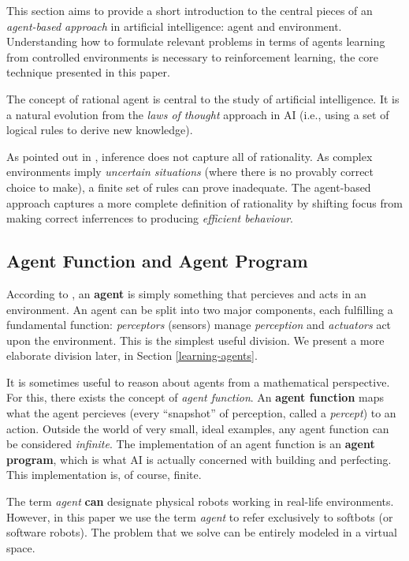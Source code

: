 This section aims to provide a short introduction to the central pieces of an \emph{agent-based approach} in artificial intelligence: agent and environment.
Understanding how to formulate relevant problems in terms of agents learning from controlled environments is necessary to reinforcement learning, the core technique presented in this paper.

The concept of rational agent is central to the study of artificial intelligence. 
It is a natural evolution from the \emph{laws of thought} approach in AI (i.e., using a set of logical rules to derive new knowledge).

As pointed out in \cite{aima}, inference does not capture all of rationality.
As complex environments imply \textit{uncertain situations} (where there is no provably correct choice to make), a finite set of rules can prove inadequate.
The agent-based approach captures a more complete definition of rationality by shifting focus from making correct inferrences to producing \emph{efficient behaviour}.

\subsection{Agent Function and Agent Program}
According to \cite{aima}, an \textbf{agent} is simply something that percieves and acts in an environment.
An agent can be split into two major components, each fulfilling a fundamental function:
\emph{perceptors} (sensors) manage \emph{perception} and \emph{actuators} act upon the environment.
This is the simplest useful division. We present a more elaborate division later, in Section \ref{learning-agents}.

It is sometimes useful to reason about agents from a mathematical perspective.
For this, there exists the concept of \emph{agent function}.
An \textbf{agent function} maps what the agent percieves (every ``snapshot'' of perception, called a \emph{percept}) to an action.
Outside the world of very small, ideal examples, any agent function can be considered \emph{infinite}.
The implementation of an agent function is an \textbf{agent program}, which is what AI is actually concerned with building and perfecting.
This implementation is, of course, finite.

The term \emph{agent} \textbf{can} designate physical robots working in real-life environments.
However, in this paper we use the term \textit{agent} to refer exclusively to softbots (or software robots).
The problem that we solve can be entirely modeled in a virtual space.

